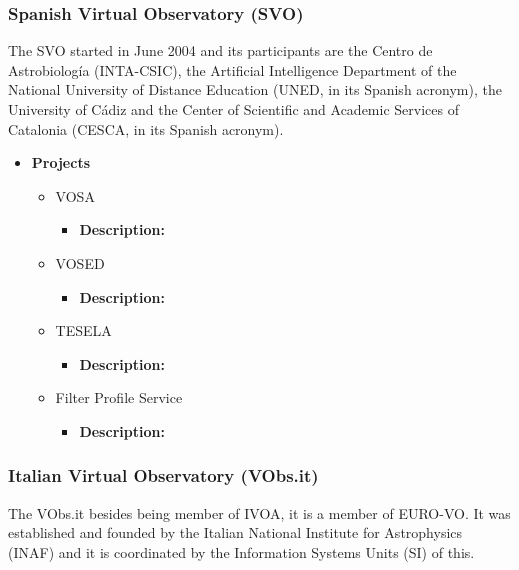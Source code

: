 \subsubsection{Spanish Virtual Observatory (SVO)}
The SVO started in June 2004 and its participants are the Centro de
Astrobiolog\'{i}a (INTA-CSIC), the Artificial Intelligence Department of the
National University of Distance Education (UNED, in its Spanish acronym), the
University of C\'{a}diz and the Center of Scientific and Academic Services of
Catalonia (CESCA, in its Spanish acronym).

\begin{itemize}
	\item \textbf{Projects}
	\begin{itemize}
		\item VOSA
			\begin{itemize}
				\item \textbf{Description:}
			\end{itemize}
		\item VOSED
			\begin{itemize}
				\item \textbf{Description:}
			\end{itemize}
		\item TESELA
			\begin{itemize}
				\item \textbf{Description:}
			\end{itemize}
		\item Filter Profile Service
			\begin{itemize}
				\item \textbf{Description:}
			\end{itemize}
	\end{itemize}
\end{itemize}

\subsubsection{Italian Virtual Observatory (VObs.it)}
The VObs.it besides being member of IVOA, it is a member of EURO-VO. It was
established and founded by the Italian National Institute for Astrophysics
(INAF) and it is coordinated by the Information Systems Units (SI) of this. 


